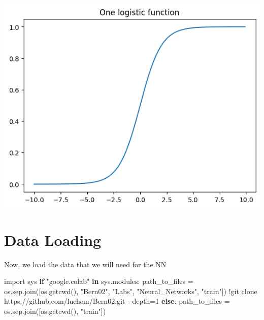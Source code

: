 \documentclass[
  letterpaper,
  DIV=11,
  numbers=noendperiod]{scrartcl}
\newenvironment{Shaded}{\begin{snugshade}}{\end{snugshade}}
\newcommand{\ControlFlowTok}[1]{\textcolor[rgb]{0.00,0.23,0.31}{\textbf{#1}}}
\newcommand{\DecValTok}[1]{\textcolor[rgb]{0.68,0.00,0.00}{#1}}
\newcommand{\ImportTok}[1]{\textcolor[rgb]{0.00,0.46,0.62}{#1}}
\newcommand{\KeywordTok}[1]{\textcolor[rgb]{0.00,0.23,0.31}{\textbf{#1}}}
\newcommand{\NormalTok}[1]{\textcolor[rgb]{0.00,0.23,0.31}{#1}}
\newcommand{\OperatorTok}[1]{\textcolor[rgb]{0.37,0.37,0.37}{#1}}
\newcommand{\StringTok}[1]{\textcolor[rgb]{0.13,0.47,0.30}{#1}}
\begin{document}
\includegraphics{NeuralNetworks_1_files/figure-pdf/cell-4-output-2.png}

\section{Data Loading}\label{data-loading}

Now, we load the data that we will need for the NN

\begin{Shaded}
\begin{Highlighting}[]
\ImportTok{import}\NormalTok{ sys}
\ControlFlowTok{if} \StringTok{"google.colab"} \KeywordTok{in}\NormalTok{ sys.modules:}
\NormalTok{    path\_to\_files }\OperatorTok{=}\NormalTok{ os.sep.join([os.getcwd(), }\StringTok{"Bern02"}\NormalTok{, }\StringTok{"Labs"}\NormalTok{, }\StringTok{"Neural\_Networks"}\NormalTok{, }\StringTok{"train"}\NormalTok{])}
    \OperatorTok{!}\NormalTok{git clone https:}\OperatorTok{//}\NormalTok{github.com}\OperatorTok{/}\NormalTok{luchem}\OperatorTok{/}\NormalTok{Bern02.git }\OperatorTok{{-}{-}}\NormalTok{depth}\OperatorTok{=}\DecValTok{1}
\ControlFlowTok{else}\NormalTok{:}
\NormalTok{    path\_to\_files }\OperatorTok{=}\NormalTok{ os.sep.join([os.getcwd(), }\StringTok{"train"}\NormalTok{])}
\end{Highlighting}
\end{Shaded}
\end{document}
